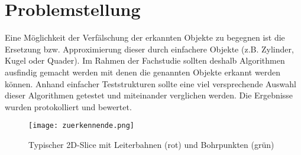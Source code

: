 
\chapter{Problemstellung}
Eine Möglichkeit der Verfälschung der erkannten Objekte zu begegnen ist die Ersetzung bzw. Approximierung dieser durch einfachere Objekte (z.B. Zylinder, Kugel oder Quader). Im Rahmen der Fachstudie sollten deshalb Algorithmen ausfindig gemacht werden mit denen die genannten Objekte erkannt werden können. Anhand einfacher Teststrukturen sollte eine viel versprechende Auswahl dieser Algorithmen getestet und miteinander verglichen werden. Die Ergebnisse wurden protokolliert und bewertet.

\begin{figure}[H]
  \begin{center}
    \texttt{[image: zuerkennende.png]}
    \caption{Typischer 2D-Slice mit Leiterbahnen (rot) und Bohrpunkten (grün)}
    \label{fig:zuerkennende1}
  \end{center}
\end{figure}

